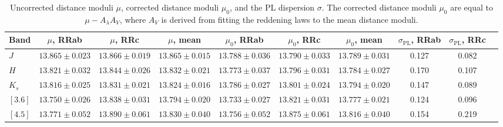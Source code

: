 \documentclass[a4paper,fleqn,usenatbib]{mnras}
\begin{document}
\begingroup
\setlength{\tabcolsep}{.5em}

\begin{table}
\centering
\caption{Uncorrected distance moduli $\mu$, corrected distance moduli $\mu_0$, and the PL dispersion $\sigma$. The corrected distance moduli $\mu_0$ are equal to $\mu - A_\lambda A_V$, where $A_V$ is derived from fitting the reddening laws to the mean distance moduli.}
\label{tab:dist_mod}
\begin{tabular}{l||c|c|c|c|c|c|c|c|r} 
\hline \hline
Band & $\mu$, RRab & $\mu$, RRc & $\mu$, mean & $\mu_0$, RRab & $\mu_0$, RRc & $\mu_0$, mean & $\sigma_{\text{PL}}$, RRab & $\sigma_{\text{PL}}$, RRc \\
\hline
$J$ & $13.865 \pm 0.023$ & $13.866 \pm 0.019$ & $13.865 \pm 0.015$ & $13.788 \pm 0.036$ & $13.790 \pm 0.033$ & $13.789 \pm 0.031$ & 0.127 & 0.082 \\
$H$ & $13.821 \pm 0.032$ & $13.844 \pm 0.026$ & $13.832 \pm 0.021$ & $13.773 \pm 0.037$ & $13.796 \pm 0.031$ & $13.784 \pm 0.027$ & 0.170 & 0.107 \\
$K_s$ & $13.816 \pm 0.025$ & $13.831 \pm 0.021$ & $13.824 \pm 0.016$ & $13.786 \pm 0.027$ & $13.801 \pm 0.024$ & $13.794 \pm 0.020$ & 0.147 & 0.089 \\
$[3.6]$ & $13.750 \pm 0.026$ & $13.838 \pm 0.031$ & $13.794 \pm 0.020$ & $13.733 \pm 0.027$ & $13.821 \pm 0.031$ & $13.777 \pm 0.021$ & 0.124 & 0.096 \\
$[4.5]$ & $13.771 \pm 0.052$ & $13.890 \pm 0.061$ & $13.830 \pm 0.040$ & $13.756 \pm 0.052$ & $13.875 \pm 0.061$ & $13.816 \pm 0.040$ & 0.154 & 0.219 \\
\hline
\end{tabular}
\end{table}

\end{document}
